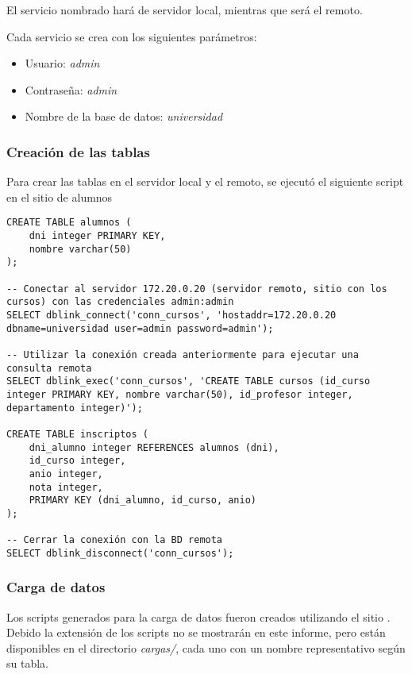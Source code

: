 El servicio nombrado  hará de servidor local, mientras que  será el remoto.

Cada servicio se crea con los siguientes parámetros:
\begin{itemize}
    \item Usuario: \emph{admin} 
    \item Contraseña: \emph{admin} 
    \item Nombre de la base de datos: \emph{universidad} 
\end{itemize}

\subsubsection{Creación de las tablas}

Para crear las tablas en el servidor local y el remoto, se ejecutó el siguiente script en el sitio de alumnos

\clearpage
\begin{lstlisting}[title=Definición de las tablas (el script SQL es \emph{crear\_tablas\_locales\_remotas.sql})]
CREATE TABLE alumnos (
    dni integer PRIMARY KEY,
    nombre varchar(50)
);

-- Conectar al servidor 172.20.0.20 (servidor remoto, sitio con los cursos) con las credenciales admin:admin
SELECT dblink_connect('conn_cursos', 'hostaddr=172.20.0.20 dbname=universidad user=admin password=admin');

-- Utilizar la conexión creada anteriormente para ejecutar una consulta remota
SELECT dblink_exec('conn_cursos', 'CREATE TABLE cursos (id_curso integer PRIMARY KEY, nombre varchar(50), id_profesor integer, departamento integer)');

CREATE TABLE inscriptos (
    dni_alumno integer REFERENCES alumnos (dni),
    id_curso integer,
    anio integer,
    nota integer,
    PRIMARY KEY (dni_alumno, id_curso, anio)
);

-- Cerrar la conexión con la BD remota
SELECT dblink_disconnect('conn_cursos');
\end{lstlisting}

\subsubsection{Carga de datos}

Los scripts generados para la carga de datos fueron creados utilizando el sitio \autocite{data}. Debido la extensión de los scripts no se mostrarán en este informe, pero están disponibles en el directorio \emph{cargas/}, cada uno con un nombre representativo según su tabla.

